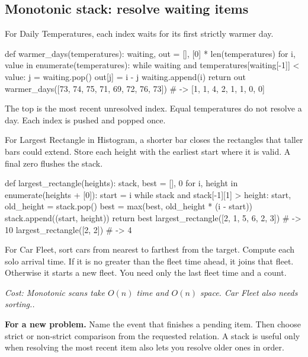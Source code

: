 \documentclass[11pt]{article}
\newcommand{\transfer}[1]{\par\textbf{For a new problem.} #1\par}
\newcommand{\cost}[1]{\par\textit{Cost: #1.}\par}
\begin{document}
\subsection{Monotonic stack: resolve waiting items}
For Daily Temperatures, each index waits for its first strictly warmer day.
\par\noindent\begin{minipage}{\linewidth}
\hypertarget{example-start-23}{}
\begin{pyex}
def warmer_days(temperatures):
    waiting, out = [], [0] * len(temperatures)
    for i, value in enumerate(temperatures):
        while waiting and temperatures[waiting[-1]] < value:
            j = waiting.pop()
            out[j] = i - j
        waiting.append(i)
    return out
warmer_days([73, 74, 75, 71, 69, 72, 76, 73]) # -> [1, 1, 4, 2, 1, 1, 0, 0]
\end{pyex}
\hypertarget{example-end-23}{}
\end{minipage}\par
The top is the most recent unresolved index. Equal temperatures do not resolve a day.
Each index is pushed and popped once.

For Largest Rectangle in Histogram, a shorter bar closes the rectangles that taller bars could extend.
Store each height with the earliest start where it is valid. A final zero flushes the stack.
\par\noindent\begin{minipage}{\linewidth}
\hypertarget{example-start-24}{}
\begin{pyex}
def largest_rectangle(heights):
    stack, best = [], 0
    for i, height in enumerate(heights + [0]):
        start = i
        while stack and stack[-1][1] > height:
            start, old_height = stack.pop()
            best = max(best, old_height * (i - start))
        stack.append((start, height))
    return best
largest_rectangle([2, 1, 5, 6, 2, 3]) # -> 10
largest_rectangle([2, 2])            # -> 4
\end{pyex}
\hypertarget{example-end-24}{}
\end{minipage}\par
For Car Fleet, sort cars from nearest to farthest from the target.
Compute each solo arrival time. If it is no greater than the fleet time ahead, it joins that fleet.
Otherwise it starts a new fleet. You need only the last fleet time and a count.
\cost{Monotonic scans take \(O(n)\) time and \(O(n)\) space. Car Fleet also needs sorting.}
\transfer{Name the event that finishes a pending item. Then choose strict or non-strict comparison from the requested relation.
A stack is useful only when resolving the most recent item also lets you resolve older ones in order.}
\end{document}
